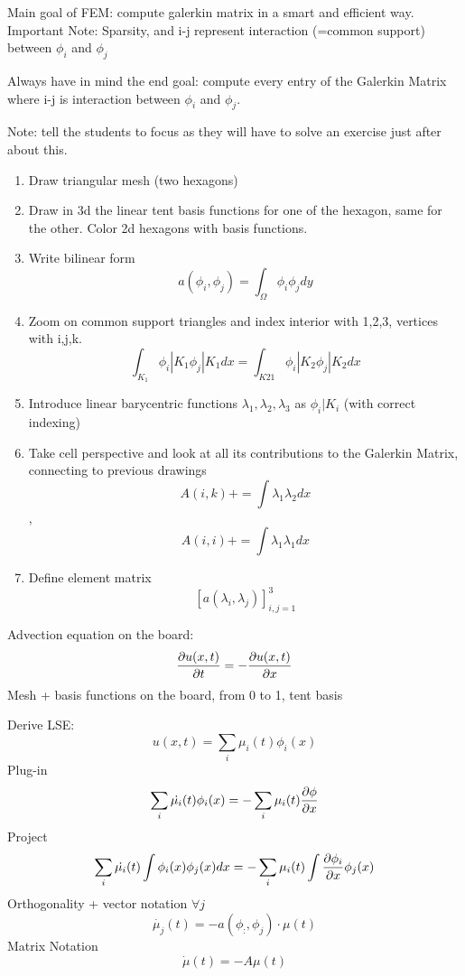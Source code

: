 Main goal of FEM: compute galerkin matrix in a smart and efficient way. 
Important Note: Sparsity, and i-j represent interaction (=common support) between $\phi_i$ and $\phi_j$

Always have in mind the end goal: compute every entry of the Galerkin Matrix where i-j is interaction between $\phi_i$ and $\phi_j$.

Note: tell the students to focus as they will have to solve an exercise just after about this.

\begin{enumerate}
    \item Draw triangular mesh (two hexagons)
    \item Draw in 3d the linear tent basis functions for one of the hexagon, same for the other. Color 2d hexagons with basis functions.
    \item Write bilinear form
    $$a(\phi_i, \phi_j) = \int_{\Omega}\phi_i\phi_j dy $$
    \item Zoom on common support triangles and index interior with 1,2,3, vertices with i,j,k.
    $$ \int_{K_1} \phi_i | K_1 \phi_j | K_1 dx = \int_{K21} \phi_i | K_2 \phi_j | K_2 dx$$
    \item Introduce linear barycentric functions $\lambda_1, \lambda_2, \lambda_3$ as $ \phi_i | K_i$ (with correct indexing)
    \item Take cell perspective and look at all its contributions to the Galerkin Matrix, connecting to previous drawings
    $$ A(i,k) += \int \lambda_1 \lambda_2 dx $$, $$ A(i,i) += \int \lambda_1 \lambda_1 dx $$
    \item Define element matrix $$[a(\lambda_i,\lambda_j)]_{i,j=1}^3$$   
    
\end{enumerate}


Advection equation on the board:
$$\pdv{u(x,t)}{t} = - \pdv{u(x,t)}{x}$$
Mesh + basis functions on the board, from 0 to 1, tent basis

Derive LSE:
$$u(x,t) = \sum_i \mu_i(t)\phi_i(x)$$
Plug-in
$$\sum_i \dot{\mu_i}(t)\phi_i(x) = - \sum_i \mu_i(t) \pdv{\phi}{x}(x)$$
Project
$$\sum_i \dot{\mu_i}(t) \int\phi_i(x)\phi_j(x)dx = - \sum_i \mu_i(t) \int\pdv{\phi_i}{x}(x)\phi_j(x)$$
Orthogonality + vector notation $\forall j$
$$\dot{\mu_j}(t) = - a (\phi_:, \phi_j) \cdot \mu(t)$$
Matrix Notation
$$\dot{\mu}(t) = - A\mu(t)$$


